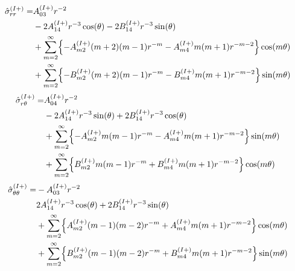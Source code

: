 \begin{align}
	\hat{\sigma}_{rr}^{(I+)} =&A_{03}^{(I+)}r^{-2}
	\nonumber
	\\
	&-2A_{14}^{(I+)}r^{-3}\cos(\theta)
	-2B_{14}^{(I+)}r^{-3}\sin(\theta)
	\nonumber
	\\
	&+\sum_{m=2}^{\infty}\Bigl\{
	-A_{m2}^{(I+)}(m+2)(m-1)r^{-m}
	-A_{m4}^{(I+)}m(m+1)r^{-m-2}\Bigr\}\cos(m\theta)
	\nonumber
	\\
	&+\sum_{m=2}^{\infty}\Bigl\{
	-B_{m2}^{(I+)}(m+2)(m-1)r^{-m}
	-B_{m4}^{(I+)}m(m+1)r^{-m-2}\Bigr\}\sin(m\theta)
	\label{eq:SigmaRROut1}
\end{align}
\begin{align}
	\hat{\sigma}_{r\theta}^{(I+)} =&A_{04}^{(I+)}r^{-2}
	\nonumber
	\\
	&-2A_{14}^{(I+)}r^{-3}\sin(\theta)
	+2B_{14}^{(I+)}r^{-3}\cos(\theta)
	\nonumber
	\\
	&+\sum_{m=2}^{\infty}\Bigl\{
	-A_{m2}^{(I+)}m(m-1)r^{-m}
	-A_{m4}^{(I+)}m(m+1)r^{-m-2}\Bigr\}\sin(m\theta)
	\nonumber
	\\
	&+\sum_{m=2}^{\infty}\Bigl\{
	B_{m2}^{(I+)}m(m-1)r^{-m}
	+B_{m4}^{(I+)}m(m+1)r^{-m-2}\Bigr\}\cos(m\theta)
	\label{eq:SigmaRThOut1}
\end{align}
\begin{align}
	\hat{\sigma}_{\theta\theta}^{(I+)} =&-A_{03}^{(I+)}r^{-2}
	\nonumber
	\\
	&2A_{14}^{(I+)}r^{-3}\cos(\theta)+2B_{14}^{(I+)}r^{-3}\sin(\theta)
	\nonumber
	\\
	&+\sum_{m=2}^{\infty}\Bigl\{A_{m2}^{(I+)}(m-1)(m-2)r^{-m}
	+A_{m4}^{(I+)}m(m+1)r^{-m-2}\Bigr\}\cos(m\theta)
	\nonumber
	\\
	&+\sum_{m=2}^{\infty}\Bigl\{B_{m2}^{(I+)}(m-1)(m-2)r^{-m}
	+B_{m4}^{(I+)}m(m+1)r^{-m-2}\Bigr\}\sin(m\theta)
	\label{eq:SigmaThThOut1}
\end{align}

\newpage
